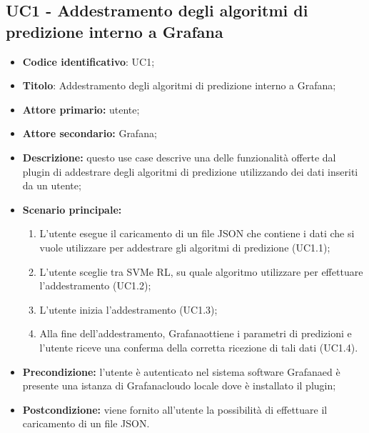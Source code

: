 \documentclass{article}
\begin{document}
	\subsection{UC1 - Addestramento degli algoritmi di predizione interno a Grafana}
	\begin{itemize}
		\item \textbf{Codice identificativo}: UC1;
		\item \textbf{Titolo}: Addestramento degli algoritmi di predizione interno a Grafana;
		\item \textbf{Attore primario:} utente;
		\item \textbf{Attore secondario:} Grafana\glo;
		\item \textbf{Descrizione:} questo use case descrive una delle funzionalità offerte dal plugin di addestrare degli algoritmi di predizione utilizzando dei dati inseriti da un utente;
		\item \textbf{Scenario principale:} 
			\begin{enumerate}
				\item L'utente esegue il caricamento di un file JSON che contiene i dati che si vuole utilizzare per addestrare gli algoritmi di predizione (UC1.1);
				\item L'utente sceglie tra SVM\glosp e RL\glosp, su quale algoritmo utilizzare per effettuare l'addestramento (UC1.2);
				\item L'utente inizia l'addestramento (UC1.3);
				\item Alla fine dell'addestramento, Grafana\glosp ottiene i parametri di predizioni e l'utente riceve una conferma della corretta ricezione di tali dati (UC1.4).
			\end{enumerate}
		\item \textbf{Precondizione:} l'utente è autenticato nel sistema software Grafana\glosp ed è presente una istanza di Grafana\glosp cloud\glosp o locale dove è installato il plugin;
		\item \textbf{Postcondizione:} viene fornito all'utente la possibilità di effettuare il caricamento di un file JSON.
	\end{itemize}
\end{document}
